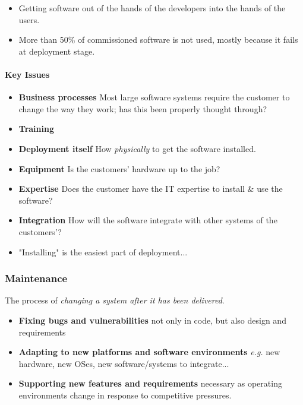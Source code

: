 \documentclass[a4paper]{article}
\providecommand{\tightlist}{%
  \setlength{\itemsep}{0pt}\setlength{\parskip}{0pt}}
\let\oldparagraph\paragraph
\renewcommand{\paragraph}[1]{\oldparagraph{#1}\mbox{}}
\begin{document}
\begin{itemize}
\tightlist
\item
  Getting software out of the hands of the developers into the hands of
  the users.
\item
  More than 50\% of commissioned software is not used, mostly because it
  fails at deployment stage.
\end{itemize}

\hypertarget{key-issues}{%
\paragraph{Key Issues}\label{key-issues}}

\begin{itemize}
\item
  \textbf{Business processes} Most large software systems require the
  customer to change the way they work; has this been properly thought
  through?
\item
  \textbf{Training}
\item
  \textbf{Deployment itself} How \emph{physically} to get the software
  installed.
\item
  \textbf{Equipment} Is the customers' hardware up to the job?
\item
  \textbf{Expertise} Does the customer have the IT expertise to install
  \& use the software?
\item
  \textbf{Integration} How will the software integrate with other
  systems of the customers'?
\item
  "Installing" is the easiest part of deployment...
\end{itemize}

\hypertarget{maintenance}{%
\subsubsection{Maintenance}\label{maintenance}}

The process of \emph{changing a system after it has been delivered}.

\begin{itemize}
\tightlist
\item
  \textbf{Fixing bugs and vulnerabilities} not only in code, but also
  design and requirements
\item
  \textbf{Adapting to new platforms and software environments}
  \emph{e.g.} new hardware, new OSes, new software/systems to
  integrate...
\item
  \textbf{Supporting new features and requirements} necessary as
  operating environments change in response to competitive pressures.
\end{itemize}
\end{document}
